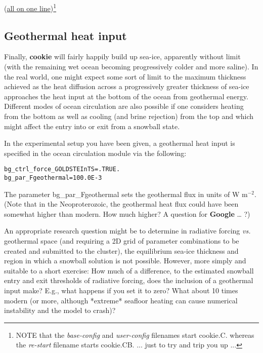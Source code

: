 \noindent (\uline{all on one line})\footnote{NOTE that the \textit{base-config} and \textit{user-config} filenames start \textsf{\footnotesize cookie.C.} whereas the\textit{ re-start} filename starts \textsf{\footnotesize cookie.CB.} ... just to try and trip you up ...}

\vspace{1mm}


\subsection{Geothermal heat input}

Finally, \textbf{cookie} will fairly happily build up sea-ice, apparently without limit (with the remaining wet ocean becoming progressively colder and more saline). In the real world, one might expect some sort of limit to the maximum thickness achieved as the heat diffusion across a progressively greater thickness of sea-ice approaches the heat input at the bottom of the ocean from geothermal energy. Different modes of ocean circulation are also possible if one considers heating from the bottom as well as cooling (and brine rejection) from the top and which might affect the entry into or exit from a snowball state.

\newpage

In the experimental setup you have been given, a geothermal heat input is specified in the ocean circulation module via the following:

\vspace{-2mm}
\small\begin{verbatim}
bg_ctrl_force_GOLDSTEInTS=.TRUE.
bg_par_Fgeothermal=100.0E-3
\end{verbatim}\normalsize
\vspace{-2mm}

The parameter \textsf{\footnotesize bg\_par\_Fgeothermal} sets the geothermal flux in units of W m$^{-2}$. (Note that in the Neoproterozoic, the geothermal heat flux could have been somewhat higher than modern. How much higher? A question for \textbf{Google} … ?)

An appropriate research question might be to determine in radiative forcing \textit{vs.} geothermal space (and requiring a 2D grid of parameter combinations to be created and submitted to the cluster), the equilibrium sea-ice thickness and region in which a snowball solution is not possible. However, more simply and suitable to a short exercise: How much of a difference, to the estimated snowball entry and exit thresholds of radiative forcing, does the inclusion of a geothermal input make? E.g., what happens if you set it to zero? What about 10 times modern (or more, although *extreme* seafloor heating can cause numerical instability and the model to crash)?

